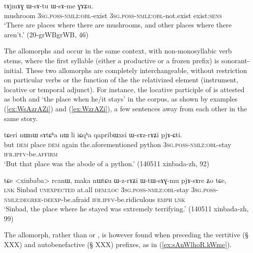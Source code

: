  \begin{exe}
\ex \label{ex:WsAme}
\gll tɤjmɤɣ ɯ-sɤ-tu ɯ-sɤ-me ɣɤʑu. \\
mushroom \textsc{3sg}.\textsc{poss}-\textsc{nmlz}:\textsc{obl}-exist  \textsc{3sg}.\textsc{poss}-\textsc{nmlz}:\textsc{obl}-not.exist  exist:\textsc{sens} \\
\glt `There are places where there are mushrooms, and other places where there aren't.' (20-grWBgrWB, 46)
\end{exe}

The allomorphs  and  occur in the same context, with non-monosyllabic verb stems, where the first syllable (either a productive or a frozen prefix) is sonorant-initial. These two allomorphs are completely interchangeable, without restriction on particular verbs or the function of the the relativized element (instrument, locative or temporal adjunct). For instance, the locative participle of  is attested as both  and  `the place when he/it stays' in the corpus, as shown by examples (\ref{ex:WsAzrAZi}) and (\ref{ex:WzrAZi}), a few sentences away from each other in the same story.

\begin{exe}
\ex \label{ex:WsAzrAZi}
\gll  tɕeri nɯnɯ sɤtɕʰa nɯ li iɕqʰa qapribɯxsi ɯ-sɤz-rɤʑi pjɤ-ɕti. \\
but \textsc{dem} place \textsc{dem} again the.aforementioned python \textsc{3sg}.\textsc{poss}-\textsc{nmlz}:\textsc{obl}-stay \textsc{ifr}.\textsc{ipfv}-be.\textsc{affirm} \\
\glt `But that place was the abode of a python.' (140511 xinbada-zh, 92)
\end{exe}

\begin{exe}
\ex \label{ex:WzrAZi}
\gll tɕe <xinbaba> rcanɯ, maka nɯtɕu ɯ-z-rɤʑi ɯ-tɯ-sɤɣ-mu pjɤ-sɤre ʑo tɕe,\\
\textsc{lnk} Sinbad \textsc{unexpected} at.all \textsc{dem}:\textsc{loc} \textsc{3sg}.\textsc{poss}-\textsc{nmlz}:\textsc{obl}-stay \textsc{3sg}.\textsc{poss}-\textsc{nmlz}:\textsc{degree}-\textsc{deexp}-be.afraid \textsc{ifr}.\textsc{ipfv}-be.ridiculous \textsc{emph} \textsc{lnk}\\
\glt `Sinbad, the place where he stayed was extremely terrifying.' (140511 xinbada-zh, 99)
\end{exe}

The  allomorph, rather than  or , is however found when preceding the vertitive (§ XXX) and autobenefactive (§ XXX) prefixes, as in (\ref{ex:sAnWlhoR.kWme}).


